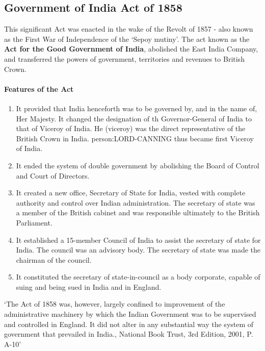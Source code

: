 \subsection{Government of India Act of 1858}

This significant Act was enacted in the wake of the Revolt of 1857 - also known as the First War of Independence of the `Sepoy mutiny'. The act known as the \textbf{Act for the Good Government of India}, abolished the East India Company, and transferred the powers of government, territories and revenues to British Crown.

\paragraph{Features of the Act}
\begin{enumerate}
  \item It provided that India henceforth was to be governed by, and in the name of, Her Majesty. It changed the designation of th Governor-General of India to that of Viceroy of India. He (viceroy) was the direct representative of the British Crown in India. \gls{person:LORD-CANNING} thus became first Viceroy of India.
  \item It ended the system of double government by abolishing the Board of Control and Court of Directors.
  \item It created a new office, Secretary of State for India, vested with complete authority and control over Indian administration. The secretary of state was a member of the British cabinet and was responsible ultimately to the British Parliament.
  \item It established a 15-member Council of India to assist the secretary of state for India. The council was an advisory body. The secretary of state was made the chairman of the council.
  \item It constituted the secretary of state-in-council as a body corporate, capable of suing and being sued in India and in England.
\end{enumerate}

`The Act of 1858 was, however, largely confined to improvement of the administrative machinery by which the Indian Government was to be supervised and controlled in England. It did not alter in any substantial way the system of government that prevailed in India., National Book Trust, 3rd Edition, 2001, P. A-10'



